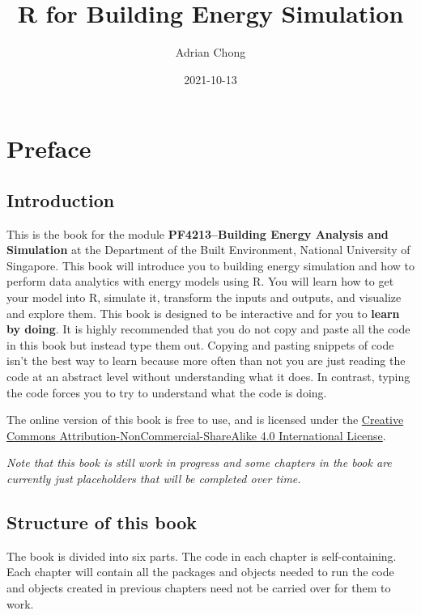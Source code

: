 \documentclass[
]{book}
\title{R for Building Energy Simulation}
\author{Adrian Chong}
\date{2021-10-13}
\begin{document}
\maketitle

{
\setcounter{tocdepth}{1}
\tableofcontents
}
\hypertarget{preface}{%
\chapter*{Preface}\label{preface}}

\hypertarget{introduction}{%
\section*{Introduction}\label{introduction}}

This is the book for the module \textbf{PF4213--Building Energy Analysis and Simulation} at the Department of the Built Environment, National University of Singapore. This book will introduce you to building energy simulation and how to perform data analytics with energy models using R. You will learn how to get your model into R, simulate it, transform the inputs and outputs, and visualize and explore them. This book is designed to be interactive and for you to \textbf{learn by doing}. It is highly recommended that you do not copy and paste all the code in this book but instead type them out. Copying and pasting snippets of code isn't the best way to learn because more often than not you are just reading the code at an abstract level without understanding what it does. In contrast, typing the code forces you to try to understand what the code is doing.

The online version of this book is free to use, and is licensed under the \href{https://creativecommons.org/licenses/by-nc-sa/4.0/}{Creative Commons Attribution-NonCommercial-ShareAlike 4.0 International License}.

\emph{Note that this book is still work in progress and some chapters in the book are currently just placeholders that will be completed over time.}

\hypertarget{structure-of-this-book}{%
\section*{Structure of this book}\label{structure-of-this-book}}

The book is divided into six parts. The code in each chapter is self-containing. Each chapter will contain all the packages and objects needed to run the code and objects created in previous chapters need not be carried over for them to work.
\end{document}
